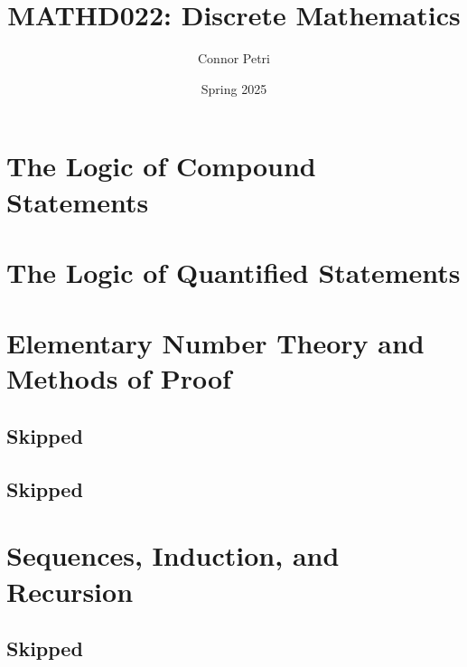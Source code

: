 \documentclass[12pt, letterpaper]{article}
\title{MATHD022: Discrete Mathematics}
\author{Connor Petri}
\date{Spring 2025}
\begin{document}
\maketitle
\pagebreak
\tableofcontents
\pagebreak





\section{The Logic of Compound Statements}




\section{The Logic of Quantified Statements}





\section{Elementary Number Theory and Methods of Proof}

\pagebreak
\subsection{Skipped}
\hrulefill



\pagebreak
\subsection{Skipped}


\section{Sequences, Induction, and Recursion}




\subsection{Skipped}
\pagebreak


\end{document}
